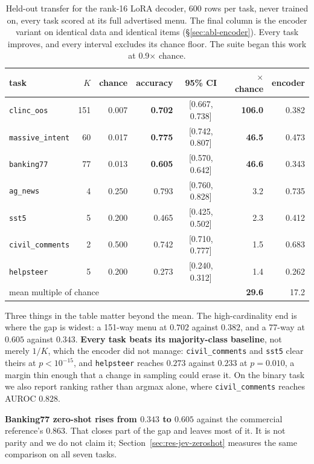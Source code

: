 \begin{table}[t]
\centering
\begin{tabular}{lrrrcrr}
\toprule
task & $K$ & chance & accuracy & 95\% CI & $\times$ chance & encoder \\
\midrule
\texttt{clinc\_oos}      & 151 & 0.007 & \textbf{0.702} & [0.667, 0.738] & \textbf{106.0} & 0.382 \\
\texttt{massive\_intent} &  60 & 0.017 & \textbf{0.775} & [0.742, 0.807] & \textbf{46.5}  & 0.473 \\
\texttt{banking77}       &  77 & 0.013 & \textbf{0.605} & [0.570, 0.642] & \textbf{46.6}  & 0.343 \\
\texttt{ag\_news}        &   4 & 0.250 & 0.793 & [0.760, 0.828] & 3.2  & 0.735 \\
\texttt{sst5}            &   5 & 0.200 & 0.465 & [0.425, 0.502] & 2.3  & 0.412 \\
\texttt{civil\_comments} &   2 & 0.500 & 0.742 & [0.710, 0.777] & 1.5  & 0.683 \\
\texttt{helpsteer}       &   5 & 0.200 & 0.273 & [0.240, 0.312] & 1.4  & 0.262 \\
\midrule
\multicolumn{5}{l}{mean multiple of chance} & \textbf{29.6} & 17.2 \\
\bottomrule
\end{tabular}
\caption{Held-out transfer for the rank-16 LoRA decoder, 600 rows per
task, never trained on, every task scored at its full advertised menu.
The final column is the encoder variant on identical data and identical
items (\S\ref{sec:abl-encoder}). Every task improves, and every interval
excludes its chance floor. The suite began this work at 0.9$\times$
chance.}
\label{tab:heldout}
\end{table}

Three things in the table matter beyond the mean. The high-cardinality
end is where the gap is widest: a 151-way menu at $0.702$ against
$0.382$, and a 77-way at $0.605$ against $0.343$. \textbf{Every task
beats its majority-class baseline}, not merely $1/K$, which the encoder
did not manage: \texttt{civil\_comments} and \texttt{sst5} clear theirs at
$p<10^{-15}$, and \texttt{helpsteer} reaches $0.273$ against $0.233$ at
$p = 0.010$, a margin thin enough that a change in sampling could erase
it. On the binary task we also report ranking rather than argmax alone,
where \texttt{civil\_comments} reaches AUROC $0.828$.

\textbf{Banking77 zero-shot rises from $0.343$ to $0.605$} against the
commercial reference's $0.863$. That closes part of the gap and leaves
most of it. It is not parity and we do not claim it;
Section~\ref{sec:res-jev-zeroshot} measures the same comparison on all
seven tasks.


